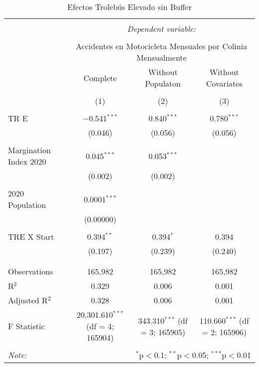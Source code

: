 
\begin{table}[!htbp] \centering 
  \caption{Efectos Trolebús Elevado sin Buffer} 
  \label{} 
\begin{tabular}{@{\extracolsep{5pt}}lccc} 
\\[-1.8ex]\hline 
\hline \\[-1.8ex] 
 & \multicolumn{3}{c}{\textit{Dependent variable:}} \\ 
\cline{2-4} 
\\[-1.8ex] & \multicolumn{3}{c}{Accidentes en Motocicleta Mensuales por Colinia Mensualmente} \\ 
 & Complete & Without Populaton & Without Covariates \\ 
\\[-1.8ex] & (1) & (2) & (3)\\ 
\hline \\[-1.8ex] 
 TR E & $-$0.541$^{***}$ & 0.840$^{***}$ & 0.780$^{***}$ \\ 
  & (0.046) & (0.056) & (0.056) \\ 
  & & & \\ 
 Margination Index 2020 & 0.045$^{***}$ & 0.053$^{***}$ &  \\ 
  & (0.002) & (0.002) &  \\ 
  & & & \\ 
 2020 Population & 0.0001$^{***}$ &  &  \\ 
  & (0.00000) &  &  \\ 
  & & & \\ 
 TRE X Start & 0.394$^{**}$ & 0.394$^{*}$ & 0.394 \\ 
  & (0.197) & (0.239) & (0.240) \\ 
  & & & \\ 
\hline \\[-1.8ex] 
Observations & 165,982 & 165,982 & 165,982 \\ 
R$^{2}$ & 0.329 & 0.006 & 0.001 \\ 
Adjusted R$^{2}$ & 0.328 & 0.006 & 0.001 \\ 
F Statistic & 20,301.610$^{***}$ (df = 4; 165904) & 343.310$^{***}$ (df = 3; 165905) & 110.660$^{***}$ (df = 2; 165906) \\ 
\hline 
\hline \\[-1.8ex] 
\textit{Note:}  & \multicolumn{3}{r}{$^{*}$p$<$0.1; $^{**}$p$<$0.05; $^{***}$p$<$0.01} \\ 
\end{tabular} 
\end{table} 
